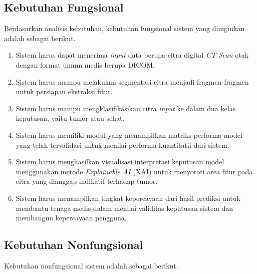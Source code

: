 \subsection{Kebutuhan Fungsional}
Berdasarkan analisis kebutuhan, kebutuhan fungsional sistem yang diinginkan adalah sebagai berikut.
\begin{enumerate}
	\item Sistem harus dapat menerima \textit{input} data berupa citra digital \textit{CT Scan} otak dengan format umum medis berupa DICOM.
	
	\item Sistem harus mampu melakukan segmentasi citra menjadi fragmen-fragmen untuk persiapan ekstraksi fitur.
	
	\item Sistem harus mampu mengklasifikasikan citra \textit{input} ke dalam dua kelas keputusan, yaitu tumor atau sehat.
	
	\item Sistem harus memiliki modul yang menampilkan matriks performa model yang telah tervalidasi untuk menilai performa kuantitatif dari sistem.
	
	\item Sistem harus menghasilkan visualisasi interpretasi keputusan model menggunakan metode \textit{Explainable AI} (XAI) untuk menyoroti area fitur pada citra yang dianggap indikatif terhadap tumor.
	
	\item Sistem harus menampilkan tingkat kepercayaan dari hasil prediksi untuk membantu tenaga medis dalam menilai validitas keputusan sistem dan membangun kepercayaan pengguna.
	
\end{enumerate}

\subsection{Kebutuhan Nonfungsional}
Kebutuhan nonfungsional sistem adalah sebagai berikut.

